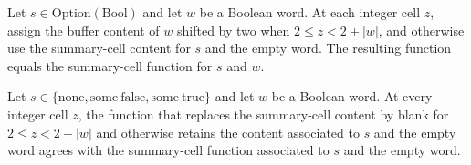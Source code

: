 \begin{lemma}
\label{Turing.StepBlock.summaryCells_copy}
\leanok
{}
Let $s\in\mathrm{Option}(\mathrm{Bool})$ and let $w$ be a Boolean word. At each integer
cell $z$, assign the buffer content of $w$ shifted by two when $2\le z<2+|w|$, and
otherwise use the summary-cell content for $s$ and the empty word. The resulting
function equals the summary-cell function for $s$ and $w$.
\end{lemma}

\begin{lemma}
\label{Turing.StepBlock.summaryCells_clear}
\leanok
{}
Let $s\in\{\mathrm{none},\mathrm{some\ false},\mathrm{some\ true}\}$ and let $w$ be a
Boolean word. At every integer cell $z$, the function that replaces the summary-cell
content by blank for $2\le z<2+|w|$ and otherwise retains the content associated to $s$
and the empty word agrees with the summary-cell function associated to $s$ and the empty
word.
\end{lemma}

